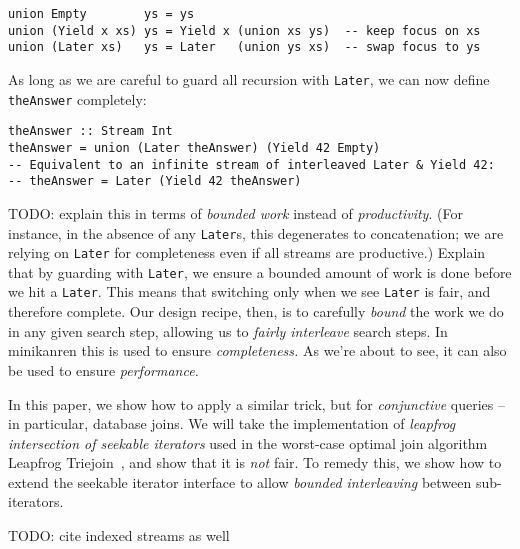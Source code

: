 \documentclass[acmsmall,screen,review,anonymous,dvipsnames,svgnames]{acmart}
\newcommand\hask[1]{\texttt{#1}}
\newcommand\ttt\texttt
\newcommand\todo[1]{{\color{Orange}#1}}
\begin{document}

\begin{verbatim}
union Empty        ys = ys
union (Yield x xs) ys = Yield x (union xs ys)  -- keep focus on xs
union (Later xs)   ys = Later   (union ys xs)  -- swap focus to ys
\end{verbatim}

\noindent
As long as we are careful to guard all recursion with \hask{Later}, we can now define \ttt{theAnswer} completely:

\begin{verbatim}
theAnswer :: Stream Int
theAnswer = union (Later theAnswer) (Yield 42 Empty)
-- Equivalent to an infinite stream of interleaved Later & Yield 42:
-- theAnswer = Later (Yield 42 theAnswer)
\end{verbatim}

\noindent
\todo{%
  TODO: explain this in terms of \emph{bounded work} instead of \emph{productivity}.
  (For instance, in the absence of any \hask{Later}s, this degenerates to concatenation; we are relying on \hask{Later} for completeness even if all streams are productive.)
  Explain that by guarding with \hask{Later}, we ensure a bounded amount of work is done before we hit a \hask{Later}.
  This means that switching only when we see \hask{Later} is fair, and therefore complete.
  Our design recipe, then, is to carefully \emph{bound} the work we do in any given search step, allowing us to \emph{fairly interleave} search steps.
  In minikanren this is used to ensure \emph{completeness.}
  As we're about to see, it can also be used to ensure \emph{performance.}
}


In this paper, we show how to apply a similar trick, but for \emph{conjunctive} queries -- in particular, database joins.
We will take the implementation of \emph{leapfrog intersection of seekable iterators} used in the worst-case optimal join algorithm Leapfrog Triejoin~\citep{lftj}, and show that it is \emph{not} fair.
To remedy this, we show how to extend the seekable iterator interface to allow \emph{bounded interleaving} between sub-iterators.

\todo{TODO: cite indexed streams as well}


\end{document}

